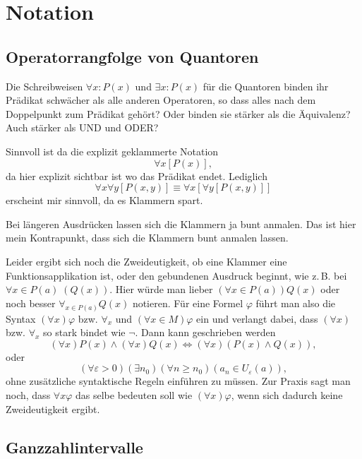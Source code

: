 \documentclass[a4paper,11pt,fleqn,twoside,BCOR=16mm]{scrartcl}
\begin{document}
\section{Notation}
\subsection{Operatorrangfolge von Quantoren}
Die Schreibweisen $\forall x\colon P(x)$ und $\exists x\colon P(x)$
für die Quantoren binden ihr Prädikat schwächer als alle anderen
Operatoren, so dass alles nach dem Doppelpunkt zum Prädikat gehört?
Oder binden sie stärker als die Äquivalenz? Auch stärker als UND und
ODER?

Sinnvoll ist da die explizit geklammerte Notation
\begin{equation}
\forall x[P(x)],
\end{equation}
da hier explizit sichtbar ist wo das Prädikat endet. Lediglich
\begin{equation}
\forall x\forall y [P(x,y)] \equiv \forall x[\forall y[P(x,y)]]
\end{equation}
erscheint mir sinnvoll, da es Klammern spart.

Bei längeren Ausdrücken lassen sich die Klammern ja bunt anmalen.
Das ist hier mein Kontrapunkt, dass sich die Klammern bunt
anmalen lassen.

Leider ergibt sich noch die Zweideutigkeit, ob eine Klammer eine
Funktionsapplikation ist, oder den gebundenen Ausdruck beginnt,
wie z.\,B. bei $\forall x{\in}P(a)\;(Q(x))$. Hier würde man lieber
$(\forall x{\in}P(a))Q(x)$ oder noch besser $\forall_{x\in P(a)} Q(x)$
notieren. Für eine Formel $\varphi$
führt man also die Syntax $(\forall x)\varphi$ bzw. $\forall_x$ und
$(\forall x{\in}M)\varphi$ ein und verlangt dabei, dass $(\forall x)$
bzw. $\forall_x$ so stark bindet wie $\neg$. Dann kann geschrieben werden
\begin{equation}
(\forall x)P(x)\land (\forall x)Q(x) \iff (\forall x)(P(x)\land Q(x)),
\end{equation}
oder
\begin{equation}
(\forall\varepsilon{>}0)(\exists n_0)(\forall n{\ge}n_0)(a_n\in U_\varepsilon(a)),
\end{equation}
ohne zusätzliche syntaktische Regeln einführen zu müssen.
Zur Praxis sagt man noch, dass $\forall x\varphi$ das selbe bedeuten
soll wie $(\forall x)\varphi$, wenn sich dadurch keine Zweideutigkeit
ergibt.

\subsection{Ganzzahlintervalle}
\end{document}
